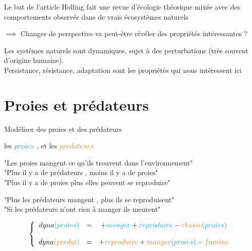 \documentclass[11,aspectratio=1610]{beamer}
\begin{document}
  

\begin{frame}{Le but de l'article }
Holling fait \alert{une revue d'écologie théorique} mixée avec des  comportements observés dans de \alert{vrais écosystèmes naturels} \\ 

\vfill

$\implies$ Changer de perspective va peut-être révéler des propriétés intéressantes ?  

\vfill
Les systèmes naturels sont \alert{dynamiques}, sujet à des \alert{perturbations} (très souvent d'origine humaine). \\

\vfill
\alert{Persistance, résistance, adaptation} sont les propriétés qui nous intéressent ici






\end{frame}
  

\section{Proies et prédateurs }





\begin{frame}{Modéliser des proies et des prédateurs  }



les $\color{cyan}{proies}$ , et les $\color{orange}{predateurs}$ 


\vfill

"Les proies mangent ce qu'ils trouvent dans l'environnement"\\
"Plus il y a de prédateurs , moins il y a de proies"\\
"Plus il y a de proies plus elles peuvent se reproduire"

\vfill

"Plus les prédateurs mangent , plus ils se reproduisent"\\
"Si les prédateurs n'ont rien à manger ils meurent"

\vfill


\[
\left\{
 \begin{array}{ccc}  
 dyna \textcolor{cyan}{(proies)}&=&  +  \textcolor{cyan}{manger} +  \textcolor{cyan}{reproduire} - \textcolor{orange}{chasse}\textcolor{cyan}{(proies)}\\
 \\
dyna\textcolor{orange}{(predat)}&=&  +  \textcolor{orange}{reproduire} + \textcolor{orange}{manger}\textcolor{cyan}{(proies)} - \textcolor{orange}{famine}  \end{array}
\right.
\]

  

\end{frame}
\end{document}

